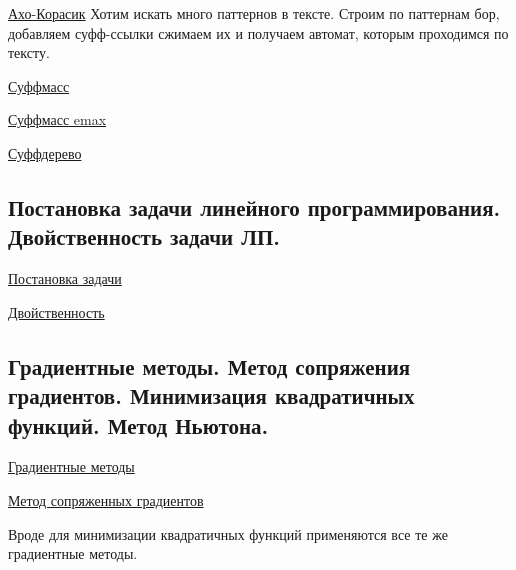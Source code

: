 \documentclass{article}
\begin{document}
\href{https://neerc.ifmo.ru/wiki/index.php?title=%D0%90%D0%BB%D0%B3%D0%BE%D1%80%D0%B8%D1%82%D0%BC_%D0%90%D1%85%D0%BE-%D0%9A%D0%BE%D1%80%D0%B0%D1%81%D0%B8%D0%BA}{Ахо-Корасик}
Хотим искать много паттернов в тексте. Строим по паттернам бор, добавляем суфф-ссылки
сжимаем их и получаем автомат, которым проходимся по тексту.

\href{https://neerc.ifmo.ru/wiki/index.php?title=%D0%A1%D1%83%D1%84%D1%84%D0%B8%D0%BA%D1%81%D0%BD%D1%8B%D0%B9_%D0%BC%D0%B0%D1%81%D1%81%D0%B8%D0%B2}{Суффмасс}

\href{https://e-maxx.ru/algo/suffix_array}{Суффмасс emax}

\href{https://neerc.ifmo.ru/wiki/index.php?title=%D0%A1%D0%B6%D0%B0%D1%82%D0%BE%D0%B5_%D1%81%D1%83%D1%84%D1%84%D0%B8%D0%BA%D1%81%D0%BD%D0%BE%D0%B5_%D0%B4%D0%B5%D1%80%D0%B5%D0%B2%D0%BE}{Суффдерево}


\subsection{Постановка задачи линейного программирования. Двойственность задачи ЛП.}

\href{https://ru.wikipedia.org/wiki/%D0%9B%D0%B8%D0%BD%D0%B5%D0%B9%D0%BD%D0%BE%D0%B5_%D0%BF%D1%80%D0%BE%D0%B3%D1%80%D0%B0%D0%BC%D0%BC%D0%B8%D1%80%D0%BE%D0%B2%D0%B0%D0%BD%D0%B8%D0%B5}{Постановка задачи}

\href{https://ru.wikipedia.org/wiki/%D0%94%D0%B2%D0%BE%D0%B9%D1%81%D1%82%D0%B2%D0%B5%D0%BD%D0%BD%D0%B0%D1%8F_%D0%B7%D0%B0%D0%B4%D0%B0%D1%87%D0%B0_%D0%BB%D0%B8%D0%BD%D0%B5%D0%B9%D0%BD%D0%BE%D0%B3%D0%BE_%D0%BF%D1%80%D0%BE%D0%B3%D1%80%D0%B0%D0%BC%D0%BC%D0%B8%D1%80%D0%BE%D0%B2%D0%B0%D0%BD%D0%B8%D1%8F}{Двойственность}


\subsection{Градиентные методы. Метод сопряжения градиентов. Минимизация квадратичных функций. Метод Ньютона.}

\href{https://ru.wikipedia.org/wiki/%D0%93%D1%80%D0%B0%D0%B4%D0%B8%D0%B5%D0%BD%D1%82%D0%BD%D1%8B%D0%B5_%D0%BC%D0%B5%D1%82%D0%BE%D0%B4%D1%8B}{Градиентные методы}

\href{http://www.machinelearning.ru/wiki/index.php?title=%D0%9C%D0%B5%D1%82%D0%BE%D0%B4_%D1%81%D0%BE%D0%BF%D1%80%D1%8F%D0%B6%D1%91%D0%BD%D0%BD%D1%8B%D1%85_%D0%B3%D1%80%D0%B0%D0%B4%D0%B8%D0%B5%D0%BD%D1%82%D0%BE%D0%B2}{Метод сопряженных градиентов}

Вроде для минимизации квадратичных функций применяются все те же градиентные методы.
\end{document}
